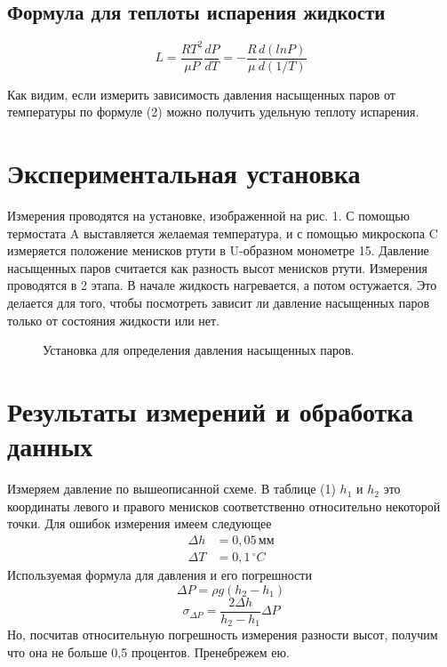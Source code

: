 \documentclass[a4paper, 12pt]{article}
\begin{document}
	\subsection*{Формула для теплоты испарения жидкости}

	\begin{equation}
		L = \frac{RT^2}{\mu P}\frac{dP}{dT} = - \frac{R}{\mu} \frac{d(ln P)}{d(1/T)}
	\end{equation}
	
	
	Как видим, если измерить зависимость давления насыщенных паров от температуры по формуле (2) можно получить удельную теплоту испарения.
	
	\section{Экспериментальная установка}
	Измерения проводятся на установке, изображенной на рис. 1. С помощью термостата A выставляется желаемая температура, и с помощью микроскопа C измеряется положение менисков ртути в U-образном монометре 15. Давление насыщенных паров считается как разность высот менисков ртути.
	Измерения проводятся в 2 этапа. В начале жидкость нагревается, а потом остужается. Это делается для того, чтобы посмотреть зависит ли давление насыщенных паров только от состояния жидкости или нет.
	
	\begin{figure}[!ht]
		\caption{Установка для определения давления насыщенных паров.}
	\end{figure}

	\newpage

	\section{Результаты измерений и обработка данных}
	Измеряем давление по вышеописанной схеме. В таблице (1) $h_1$ и $h_2$ это координаты левого и правого менисков соответственно относительно некоторой точки. 
	Для ошибок измерения имеем следующее
	\begin{align*}
		\Delta h &= 0,05 \hspace{2pt} мм\\
		\Delta T &= 0,1 \hspace{2pt} ^\circ C
	\end{align*}
	Используемая формула для давления и его погрешности
	\[ \Delta P = \rho g (h_2 - h_1) \] 
	\[ \sigma_{\Delta P} =  \dfrac{2 \Delta h}{h_2 - h_1} \Delta P\]
	Но, посчитав относительную погрешность измерения разности высот, получим что она не больше 0,5 процентов. Пренебрежем ею.
\end{document}
